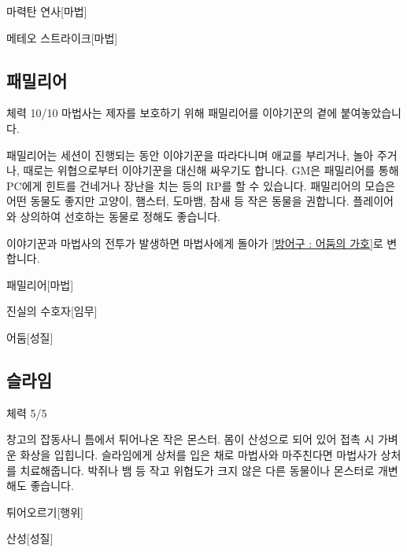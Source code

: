 \documentclass{report}
\begin{document}
		\begin{spoiler}{마력탄 연사}{[마법]}
		\end{spoiler}
		
		\begin{spoiler}{메테오 스트라이크}{[마법]}
		\end{spoiler}
	
	\pagebreak 
	\subsection*{패밀리어}
		체력 10/10
		마법사는 제자를 보호하기 위해 패밀리어를 이야기꾼의 곁에 붙여놓았습니다.
		
		패밀리어는 세션이 진행되는 동안 이야기꾼을 따라다니며 애교를 부리거나, 놀아 주거나, 때로는 위협으로부터 이야기꾼을 대신해 싸우기도 합니다. GM은 패밀리어를 통해 PC에게 힌트를 건네거나 장난을 치는 등의 RP를 할 수 있습니다. 패밀리어의 모습은 어떤 동물도 좋지만 고양이, 햄스터, 도마뱀, 참새 등 작은 동물을 권합니다. 플레이어와 상의하여 선호하는 동물로 정해도 좋습니다.
		
		이야기꾼과 마법사의 전투가 발생하면 마법사에게 돌아가 \hyperlink{npc-wizard:armor}{[방어구 : 어둠의 가호]}로 변합니다.
		
		\begin{spoiler}{패밀리어}{[마법]}
		\end{spoiler}
		
		\begin{spoiler}{진실의 수호자}{[임무]}
		\end{spoiler}
		
		\begin{spoiler}{어둠}{[성질]}
		\end{spoiler}
	
	\pagebreak 
	\subsection*{슬라임}
		체력 5/5
		
		창고의 잡동사니 틈에서 튀어나온 작은 몬스터. 몸이 산성으로 되어 있어 접촉 시 가벼운 화상을 입힙니다. 슬라임에게 상처를 입은 채로 마법사와 마주친다면 마법사가 상처를 치료해줍니다. 박쥐나 뱀 등 작고 위협도가 크지 않은 다른 동물이나 몬스터로 개변해도 좋습니다.
		
		\begin{spoiler}{튀어오르기}{[행위]}
		\end{spoiler}
		
		\begin{spoiler}{산성}{[성질]}
		\end{spoiler}
	
\end{document}
